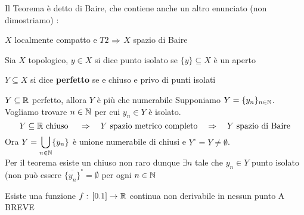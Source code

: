 \begin{oss}
\end{oss}Il Teorema \`e detto di Baire, che contiene anche un altro enunciato (non dimostriamo) :
\begin{thm}$X$ localmente compatto e $T2$ $\Rightarrow$ $X$ spazio di Baire
\end{thm}
\spazio 
\begin{defn}Sia $X$ topologico, $y \in X$ si dice punto isolato se $\{y\} \subseteq X$ \`e un aperto 
\end{defn}
\begin{defn}$Y \subseteq X$ si dice \textbf{ perfetto } se e chiuso e privo di punti isolati
\end{defn}
\begin{prop}
$Y\subseteq \mathbb{R}$ perfetto, allora $Y$ \`e pi\`u che numerabile
\proof Supponiamo $Y=\displaystyle\{y_n\}_{n \in \mathbb{N}}$.\\
Vogliamo trovare $n \in \mathbb{N}$ per cui $y_n\in Y$ \`e isolato.
$$ Y \subseteq \mathbb{R} \text{ chiuso } \quad \Rightarrow \quad Y \text{ spazio metrico completo} \quad \Rightarrow \quad Y \text{ spazio di Baire}$$
Ora $Y=\displaystyle \bigcup_{n\in \mathbb{N}} \{y_n\}$ \`e unione numerabile di chiusi e $Y^\circ = Y \neq \emptyset$.\\
Per il teorema esiste un chiuso non raro dunque $\exists n$ tale che $y_n\in Y$ punto isolato (non pu\`o essere $\overline{\{y_n\}}^\circ =\emptyset$ per ogni $n \in \mathbb{N}$
\endproof
\end{prop}
\newpage
\begin{thm}Esiste una funzione $f:\, [0.1]\to \mathbb{R}$ continua non derivabile in nessun punto
\proof A BREVE
\end{thm}
